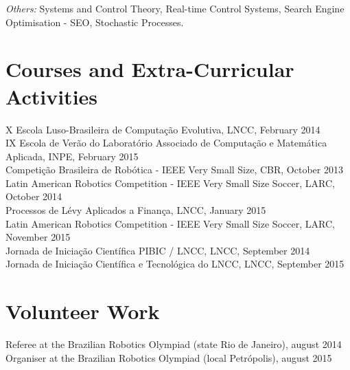 \documentclass[margin, 10pt]{res} %
\begin{document}
\begin{resume}
{\sl Others:} Systems and Control Theory, Real-time Control Systems, Search Engine Optimisation - SEO, Stochastic Processes.
 

\section{Courses and Extra-Curricular Activities} 
X Escola Luso-Brasileira de Computação Evolutiva, LNCC, February 2014\\
IX Escola de Verão do Laboratório Associado de Computação e Matemática Aplicada, INPE, February 2015\\
Competição Brasileira de Robótica - IEEE Very Small Size, CBR, October 2013\\
Latin American Robotics Competition - IEEE Very Small Size Soccer, LARC, October 2014\\
Processos de Lévy Aplicados a Finança, LNCC, January 2015\\
Latin American Robotics Competition - IEEE Very Small Size Soccer, LARC, November 2015\\
Jornada de Iniciação Científica PIBIC / LNCC, LNCC, September 2014\\
Jornada de Iniciação Científica e Tecnológica do LNCC, LNCC, September 2015 


\section{Volunteer Work}

Referee at the Brazilian Robotics Olympiad (state Rio de Janeiro), august 2014\\
Organiser at the Brazilian Robotics Olympiad (local Petrópolis), august 2015


\end{resume}
\end{document}
